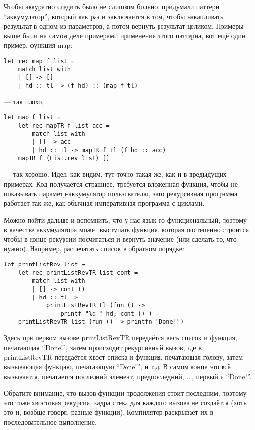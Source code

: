 \documentclass[a5paper]{article}
\begin{document}
Чтобы аккуратно следить было не слишком больно, придумали паттерн ``аккумулятор'', который как раз и заключается в том, чтобы накапливать результат в одном из параметров, а потом вернуть результат целиком. Примеры выше были на самом деле примерами применения этого паттерна, вот ещё один пример, функция map:

\begin{verbatim}
let rec map f list =
    match list with
    | [] -> []
    | hd :: tl -> (f hd) :: (map f tl)
\end{verbatim}

--- так плохо, 

\begin{verbatim}
let map f list =
    let rec mapTR f list acc =
        match list with
        | [] -> acc
        | hd :: tl -> mapTR f tl (f hd :: acc)
    mapTR f (List.rev list) []
\end{verbatim}

--- так хорошо. Идея, как видим, тут точно такая же, как и в предыдущих примерах. Код получается страшнее, требуется вложенная функция, чтобы не показывать параметр-аккумулятор пользователю, зато рекурсивная программа работает так же, как обычная императивная программа с циклами.

Можно пойти дальше и вспомнить, что у нас язык-то функциональный, поэтому в качестве аккумулятора может выступать функция, которая постепенно строится, чтобы в конце рекурсии посчитаться и вернуть значение (или сделать то, что нужно). Например, распечатать список в обратном порядке:

\begin{verbatim}
let printListRev list =
    let rec printListRevTR list cont =
        match list with
        | [] -> cont ()
        | hd :: tl ->
            printListRevTR tl (fun () -> 
                printf "%d " hd; cont () )
    printListRevTR list (fun () -> printfn "Done!")
\end{verbatim}

Здесь при первом вызове printListRevTR передаётся весь список и функция, печатающая ``Done!'', затем происходит рекурсивный вызов, где в printListRevTR передаётся хвост списка и функция, печатающая голову, затем вызывающая функцию, печатающую ``Done!'', и т.д. В самом конце это всё вызывается, печатается последний элемент, предпоследний, ..., первый и ``Done!''.

Обратите внимание, что вызов функции-продолжения стоит последним, поэтому это тоже хвостовая рекурсия, кадра стека для каждого вызова не создаётся (хоть это и, вообще говоря, разные функции). Компилятор раскрывает их в последовательное выполнение.
\end{document}

